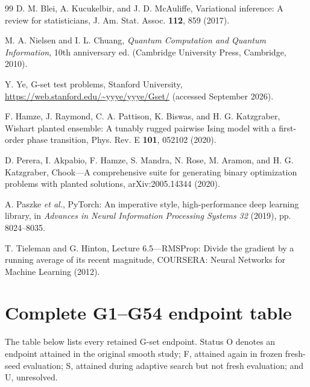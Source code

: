 \documentclass[
  aps,
  prx,
  reprint,
  amsmath,
  amssymb,
  groupedaddress,
  nofootinbib,
  floatfix,
  longbibliography
]{revtex4-2}
\begin{document}
\begin{thebibliography}{99}
D. M. Blei, A. Kucukelbir, and J. D. McAuliffe, Variational inference: A
review for statisticians, J. Am. Stat. Assoc. \textbf{112}, 859 (2017).

M. A. Nielsen and I. L. Chuang, \emph{Quantum Computation and Quantum
Information}, 10th anniversary ed. (Cambridge University Press, Cambridge,
2010).

Y. Ye, G-set test problems, Stanford University,
\url{https://web.stanford.edu/~yyye/yyye/Gset/} (accessed September 2026).

F. Hamze, J. Raymond, C. A. Pattison, K. Biswas, and H. G. Katzgraber,
Wishart planted ensemble: A tunably rugged pairwise Ising model with a
first-order phase transition, Phys. Rev. E \textbf{101}, 052102 (2020).

D. Perera, I. Akpabio, F. Hamze, S. Mandra, N. Rose, M. Aramon, and
H. G. Katzgraber, Chook---A comprehensive suite for generating binary
optimization problems with planted solutions, arXiv:2005.14344 (2020).

A. Paszke \emph{et al.}, PyTorch: An imperative style, high-performance deep
learning library, in \emph{Advances in Neural Information Processing Systems
32} (2019), pp. 8024--8035.

T. Tieleman and G. Hinton, Lecture 6.5---RMSProp: Divide the gradient by a
running average of its recent magnitude, COURSERA: Neural Networks for Machine
Learning (2012).

\end{thebibliography}

\appendix

\newpage
\section{Complete G1--G54 endpoint table}
\label{app:gset-results}

\noindent
The table below lists every retained G-set endpoint.  Status O denotes an
endpoint attained in the original smooth study; F, attained again in frozen
fresh-seed evaluation; S, attained during adaptive search but not fresh
evaluation; and U, unresolved.
\end{document}

